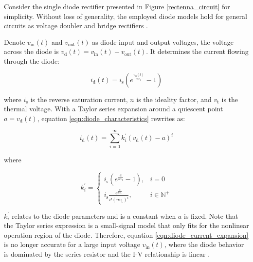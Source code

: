 Consider the single diode rectifier presented in Figure \ref{rectenna_circuit} for simplicity. Without loss of generality, the employed diode models hold for general circuits as voltage doubler and bridge rectifiers \cite{Clerckx2017}.

Denote ${v_{{\text{in}}}}(t)$ and ${v_{{\text{out}}}}(t)$ as diode input and output voltages, the voltage across the diode is ${v_{\text{d}}}(t) = {v_{{\text{in}}}}(t) - {v_{{\text{out}}}}(t)$. It determines the current flowing through the diode:

\begin{equation}\label{eqn:diode_characteristics}
  {i_{\text{d}}}(t) = {i_{\text{s}}}\left( {{e^{\frac{{{v_{\text{d}}}(t)}}{{n{v_{\text{t}}}}}}} - 1} \right)
\end{equation}

where ${i_{\text{s}}}$ is the reverse saturation current, $n$ is the ideality factor, and ${{v_{\text{t}}}}$ is the thermal voltage. With a Taylor series expansion around a quiescent point $a = {v_{\text{d}}}(t)$, equation \ref{eqn:diode_characteristics} rewrites as:

\begin{equation}\label{eqn:diode_current_expansion}
  {i_{\text{d}}}(t) = \sum\limits_{i = 0}^\infty  {k_i^\prime } {\left( {{v_{\text{d}}}(t) - a} \right)^i}
\end{equation}

where

\begin{equation}\label{eqn:diode_k_prime}
  k_i^\prime  = \left\{ {
  \begin{array}{*{20}{c}}
    {{i_{\text{s}}}\left( {{e^{\frac{a}{{n{v_{\text{t}}}}}}} - 1} \right),}&{i = 0} \\
    {{i_{\text{s}}}\frac{{{e^{\frac{a}{{n{v_{\text{t}}}}}}}}}{{i!{{\left( {n{v_{\text{t}}}} \right)}^i}}},}&{i \in {\mathbb{N}^ + }}
  \end{array}} \right.
\end{equation}


$k_i^\prime $ relates to the diode parameters and is a constant when $a$ is fixed. Note that the Taylor series expression is a small-signal model that only fits for the nonlinear operation region of the diode. Therefore, equation \ref{eqn:diode_current_expansion} is no longer accurate for a large input voltage ${v_{{\text{in}}}}(t)$, where the diode behavior is dominated by the series resistor and the I-V relationship is linear \cite{Boaventura2013}.

